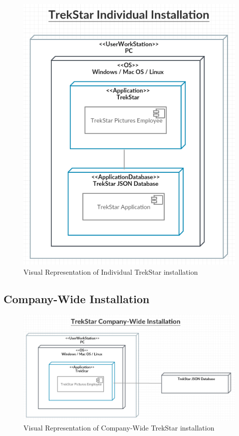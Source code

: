 \documentclass[
  english,
  a4paper,
,tablecaptionabove
]{scrartcl}
\begin{document}
\begin{figure}
\centering
\includegraphics{images/deployment-diagrams/trekstar-individual-installation.png}
\caption{Visual Representation of Individual TrekStar installation}
\end{figure}

\hypertarget{company-wide-installation}{%
\subsection{Company-Wide Installation}\label{company-wide-installation}}

\begin{figure}
\centering
\includegraphics{images/deployment-diagrams/trekstar-company-installation.png}
\caption{Visual Representation of Company-Wide TrekStar installation}
\end{figure}
\end{document}
